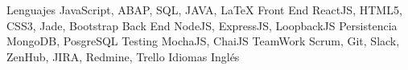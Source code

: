 


\begin{cvskills}

\cvskill
{Lenguajes} %
{JavaScript, ABAP, SQL, JAVA, \LaTeX{} } %
\cvskill
{Front End} %
{ReactJS, HTML5, CSS3, Jade, Bootstrap} %
\cvskill
{Back End} %
{NodeJS, ExpressJS, LoopbackJS} %
\cvskill
{Persistencia} %
{MongoDB, PosgreSQL} %
\cvskill
{Testing} %
{MochaJS, ChaiJS} %
\cvskill
{TeamWork} %
{Scrum, Git, Slack, ZenHub, JIRA, Redmine, Trello} %
\cvskill
{Idiomas} %
{Inglés} %
\end{cvskills}
